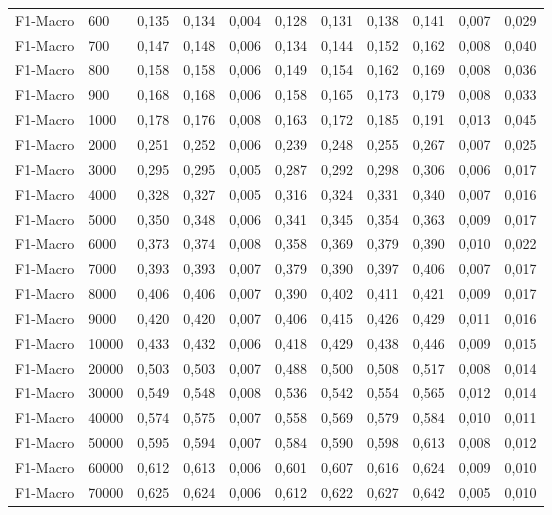 \begin{longtable}{@{}llrrrrrrrrr@{}}
F1-Macro & 600 & 0,135 & 0,134 & 0,004 & 0,128 & 0,131 & 0,138 & 0,141 & 0,007 & 0,029 \\
F1-Macro & 700 & 0,147 & 0,148 & 0,006 & 0,134 & 0,144 & 0,152 & 0,162 & 0,008 & 0,040 \\
F1-Macro & 800 & 0,158 & 0,158 & 0,006 & 0,149 & 0,154 & 0,162 & 0,169 & 0,008 & 0,036 \\
F1-Macro & 900 & 0,168 & 0,168 & 0,006 & 0,158 & 0,165 & 0,173 & 0,179 & 0,008 & 0,033 \\
F1-Macro & 1000 & 0,178 & 0,176 & 0,008 & 0,163 & 0,172 & 0,185 & 0,191 & 0,013 & 0,045 \\
F1-Macro & 2000 & 0,251 & 0,252 & 0,006 & 0,239 & 0,248 & 0,255 & 0,267 & 0,007 & 0,025 \\
F1-Macro & 3000 & 0,295 & 0,295 & 0,005 & 0,287 & 0,292 & 0,298 & 0,306 & 0,006 & 0,017 \\
F1-Macro & 4000 & 0,328 & 0,327 & 0,005 & 0,316 & 0,324 & 0,331 & 0,340 & 0,007 & 0,016 \\
F1-Macro & 5000 & 0,350 & 0,348 & 0,006 & 0,341 & 0,345 & 0,354 & 0,363 & 0,009 & 0,017 \\
F1-Macro & 6000 & 0,373 & 0,374 & 0,008 & 0,358 & 0,369 & 0,379 & 0,390 & 0,010 & 0,022 \\
F1-Macro & 7000 & 0,393 & 0,393 & 0,007 & 0,379 & 0,390 & 0,397 & 0,406 & 0,007 & 0,017 \\
F1-Macro & 8000 & 0,406 & 0,406 & 0,007 & 0,390 & 0,402 & 0,411 & 0,421 & 0,009 & 0,017 \\
F1-Macro & 9000 & 0,420 & 0,420 & 0,007 & 0,406 & 0,415 & 0,426 & 0,429 & 0,011 & 0,016 \\
F1-Macro & 10000 & 0,433 & 0,432 & 0,006 & 0,418 & 0,429 & 0,438 & 0,446 & 0,009 & 0,015 \\
F1-Macro & 20000 & 0,503 & 0,503 & 0,007 & 0,488 & 0,500 & 0,508 & 0,517 & 0,008 & 0,014 \\
F1-Macro & 30000 & 0,549 & 0,548 & 0,008 & 0,536 & 0,542 & 0,554 & 0,565 & 0,012 & 0,014 \\
F1-Macro & 40000 & 0,574 & 0,575 & 0,007 & 0,558 & 0,569 & 0,579 & 0,584 & 0,010 & 0,011 \\
F1-Macro & 50000 & 0,595 & 0,594 & 0,007 & 0,584 & 0,590 & 0,598 & 0,613 & 0,008 & 0,012 \\
F1-Macro & 60000 & 0,612 & 0,613 & 0,006 & 0,601 & 0,607 & 0,616 & 0,624 & 0,009 & 0,010 \\
F1-Macro & 70000 & 0,625 & 0,624 & 0,006 & 0,612 & 0,622 & 0,627 & 0,642 & 0,005 & 0,010 \\

\end{longtable}
